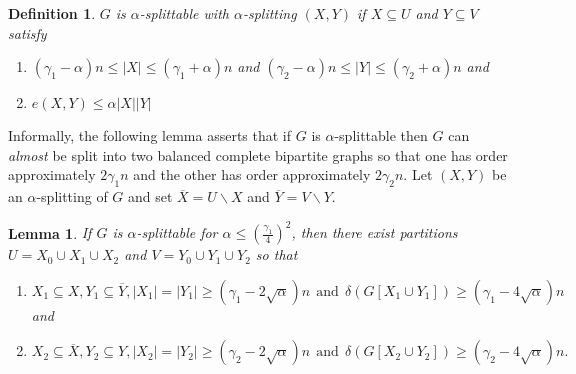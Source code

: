 \documentclass[oneside,12pt]{memoir}
\newtheorem{lemma}[theorem]{Lemma}
\newtheorem{definition}[theorem]{Definition}
\newcommand{\g}{\gamma}
\begin{document}
\begin{definition} \label{Sp}
$G$ is $\alpha$-\emph{splittable} with $\alpha $-\emph{splitting} $(X,Y)$ if $X\subseteq U$ and $Y\subseteq V$ satisfy
\begin{enumerate}
\item $(\g_1-\alpha)n\leq |X|\leq(\g_{1}+\alpha)n$ and $(\g_2-\alpha)n\leq |Y|\leq(\gamma_{2}+\alpha)n$ and
\item $e(X,Y)\leq\alpha|X||Y|$
\end{enumerate}
\end{definition}
Informally, the following lemma asserts that if $G$ is
$\alpha$-splittable then $G$ can \emph{almost} be split into two
balanced complete bipartite graphs so that one has order approximately
$2\gamma_{1}n$ and the other has order approximately $2\gamma_{2}n$.
Let $(X,Y)$ be an $\alpha$-splitting of $G$ and set $\overline{X}=U\smallsetminus X$
and $\overline{Y}=V\smallsetminus Y$.

\begin{lemma} \label{split} If $G$ is $\alpha$-splittable for $\alpha\leq \left(\frac{\g_1}{4}\right)^2$, then there exist partitions
$U=X_{0}\cup X_{1}\cup X_{2}$ and $V=Y_{0}\cup Y_{1}\cup Y_{2}$
so that

\begin{enumerate}
\item $X_{1}\subseteq X,Y_{1}\subseteq\overline{Y},\left\vert X_{1}\right\vert =\left\vert Y_{1}\right\vert \geq(\gamma_{1}-2\sqrt{\alpha})n ~~\text{and}~~ \delta(G[X_{1}\cup Y_{1}])\geq(\gamma_{1}-4\sqrt{\alpha})n~~$and

\item $X_{2}\subseteq\overline{X},Y_{2}\subseteq Y,\left\vert X_{2}\right\vert =\left\vert Y_{2}\right\vert \geq(\gamma_{2}-2\sqrt{\alpha})n ~~\text{and}~~ \delta(G[X_{2}\cup Y_{2}])\geq(\gamma_{2}-4\sqrt{\alpha})n.$
\end{enumerate}
\end{lemma}
\end{document}
